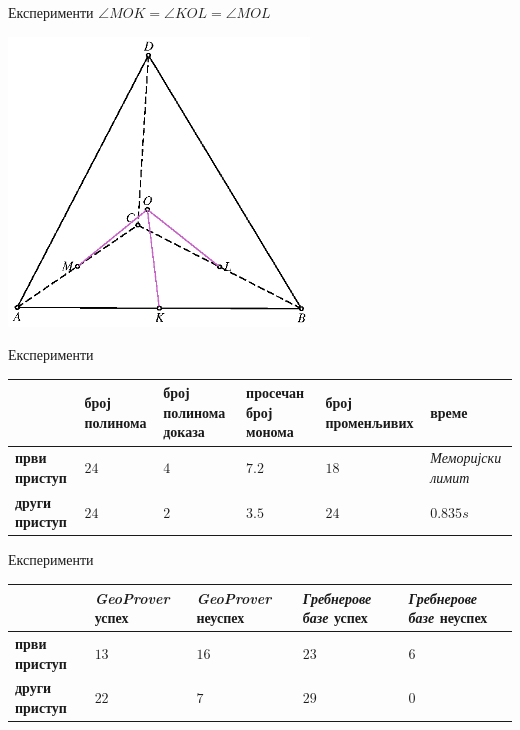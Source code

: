 \documentclass[slidestop, compress, mathserif, containsverbatim, xcolor=dvipsnames]{beamer}
\begin{document}
\begin{frame}{Експерименти}
  $\angle MOK = \angle KOL = \angle MOL$

  \begin{center}
    \includegraphics[width=8cm]{./slike/jednaki_uglovi.eps}
  \end{center}
\end{frame}
  
\begin{frame}{Експерименти}
  \begin{center}
    \begin{tabular}{L{1.2cm}||R{1.5cm}|R{1.5cm}|R{1.5cm}|R{1.5cm}|R{0.8cm}}
      \                   &  број полинома & број полинома доказа & просечан број монома & број про\-ме\-нљи\-вих & време \\
      \hline
      \hline
      \textbf{први приступ} & $24$ & $4$ & $7.2$ & $18$ & \emph{Меморијски лимит} \\
      \hline
      \textbf{други приступ} & $24$ & $2$ & $3.5$ & $24$ & $0.835s$
    \end{tabular}
  \end{center}
\end{frame}

\begin{frame}{Експерименти}
  \begin{tabular}{L{1.8cm}||R{1.8cm}|R{1.8cm}|R{1.8cm}|R{1.8cm}}
    \                      & \emph{GeoProver} успех & \emph{GeoProver} неуспех & \emph{Гребнерове базе} успех & \emph{Гребнерове базе} неуспех \\
    \hline
    \hline
    \textbf{први приступ}  &  $13$                  & $16$                     &  $23$                        & $6$  \\
    \hline
    \textbf{други приступ} &  $22$                  & $7$                      &  $29$                        & $0$ \\
  \end{tabular}
\end{frame}
\end{document}

